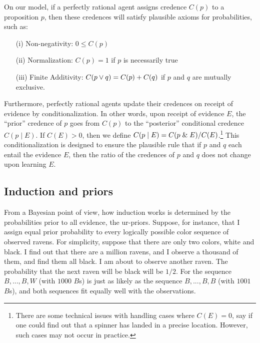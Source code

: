 On our model, if a perfectly rational agent assigns credence $C(p)$ to a proposition $p$, then these credences will 
satisfy plausible axioms for probabilities, such as:
\begin{enumerate}
\item[(i)] Non-negativity: $0 \le C(p)$
\item[(ii)] Normalization: $C(p)=1$ if $p$ is necessarily true
\item[(iii)] Finite Additivity: $C(p\vee q)=C(p)+C(q)$ if $p$ and $q$ are mutually exclusive.
\end{enumerate}

Furthermore, perfectly rational agents update their credences on receipt of evidence by conditionalization.
In other words, upon receipt of evidence $E$, the ``prior'' credence of $p$ goes from $C(p)$ to the 
``posterior'' conditional credence $C(p\mid E)$. If $C(E)>0$, then we define $C(p\mid E)=C(p\mathrel{\&} E)/C(E)$.\footnote{There 
are some technical issues with handling cases where $C(E)=0$, say if one could find out that a spinner
has landed in a precise location. However, such cases may not occur in practice.} This conditionalization is 
designed to ensure the plausible rule that if $p$ and $q$ each entail the evidence $E$, then the ratio of the 
credences of $p$ and $q$ does not change upon learning $E$. 

\subsection{Induction and priors}
From a Bayesian point of view, how induction works is determined by the probabilities prior to all evidence, the ur-priors.
Suppose, for instance, that I assign equal prior probability to every logically possible color sequence of observed ravens. 
For simplicity, suppose that there are only two colors, white and black.  I find out that there are a million ravens, and 
I observe a thousand of them, and find them all black. I am about to observe another raven. The probability that the next 
raven will be black will be $1/2$. For the sequence $B,...,B,W$ (with $1000$ $B$s) is just as likely as the sequence
$B,...,B,B$ (with $1001$ $B$s), and both sequences fit equally well with the observations. 

